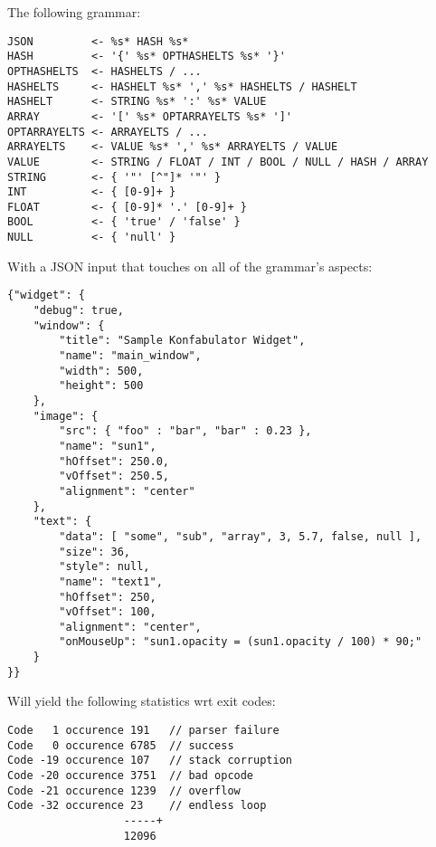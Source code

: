 The following grammar:

\begin{myquote}
\begin{verbatim}
JSON         <- %s* HASH %s*
HASH         <- '{' %s* OPTHASHELTS %s* '}'
OPTHASHELTS  <- HASHELTS / ...
HASHELTS     <- HASHELT %s* ',' %s* HASHELTS / HASHELT
HASHELT      <- STRING %s* ':' %s* VALUE
ARRAY        <- '[' %s* OPTARRAYELTS %s* ']'
OPTARRAYELTS <- ARRAYELTS / ...
ARRAYELTS    <- VALUE %s* ',' %s* ARRAYELTS / VALUE
VALUE        <- STRING / FLOAT / INT / BOOL / NULL / HASH / ARRAY
STRING       <- { '"' [^"]* '"' }
INT          <- { [0-9]+ }
FLOAT        <- { [0-9]* '.' [0-9]+ }
BOOL         <- { 'true' / 'false' }
NULL         <- { 'null' }

\end{verbatim}
\end{myquote}

With a JSON input that touches on all of the grammar's aspects:

\begin{myquote}
\begin{verbatim}
{"widget": {
    "debug": true,
    "window": {
        "title": "Sample Konfabulator Widget",
        "name": "main_window",
        "width": 500,
        "height": 500
    },
    "image": {
        "src": { "foo" : "bar", "bar" : 0.23 },
        "name": "sun1",
        "hOffset": 250.0,
        "vOffset": 250.5,
        "alignment": "center"
    },
    "text": {
        "data": [ "some", "sub", "array", 3, 5.7, false, null ],
        "size": 36,
        "style": null,
        "name": "text1",
        "hOffset": 250,
        "vOffset": 100,
        "alignment": "center",
        "onMouseUp": "sun1.opacity = (sun1.opacity / 100) * 90;"
    }
}}

\end{verbatim}
\end{myquote}

Will yield the following statistics wrt exit codes:

\begin{myquote}
\begin{verbatim}
Code   1 occurence 191   // parser failure
Code   0 occurence 6785  // success
Code -19 occurence 107   // stack corruption
Code -20 occurence 3751  // bad opcode
Code -21 occurence 1239  // overflow
Code -32 occurence 23    // endless loop
                  -----+
                  12096

\end{verbatim}
\end{myquote}

